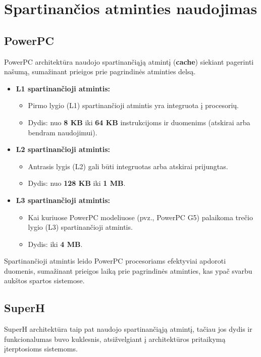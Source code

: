 \documentclass{article}
\begin{document}
\section{Spartinančios atminties naudojimas}
\subsection{PowerPC}
PowerPC architektūra naudojo spartinančiąją atmintį (\textbf{cache}) siekiant pagerinti našumą, sumažinant prieigos prie pagrindinės atminties delsą.

\begin{itemize}
    \item \textbf{L1 spartinančioji atmintis:}
        \begin{itemize}
            \item Pirmo lygio (L1) spartinančioji atmintis yra integruota į procesorių.
            \item Dydis: nuo \textbf{8 KB} iki \textbf{64 KB} instrukcijoms ir duomenims (atskirai arba bendram naudojimui).
        \end{itemize}
    \item \textbf{L2 spartinančioji atmintis:}
        \begin{itemize}
            \item Antrasis lygis (L2) gali būti integruotas arba atskirai prijungtas.
            \item Dydis: nuo \textbf{128 KB} iki \textbf{1 MB}.
        \end{itemize}
    \item \textbf{L3 spartinančioji atmintis:}
        \begin{itemize}
            \item Kai kuriuose PowerPC modeliuose (pvz., PowerPC G5) palaikoma trečio lygio (L3) spartinančioji atmintis.
            \item Dydis: iki \textbf{4 MB}.
        \end{itemize}
\end{itemize}

Spartinančioji atmintis leido PowerPC procesoriams efektyviai apdoroti duomenis, sumažinant prieigos laiką prie pagrindinės atminties, kas ypač svarbu aukštos spartos sistemose.

\subsection{SuperH}
SuperH architektūra taip pat naudojo spartinančiąją atmintį, tačiau jos dydis ir funkcionalumas buvo kuklesnis, atsižvelgiant į architektūros pritaikymą įterptosioms sistemoms.
\end{document}
